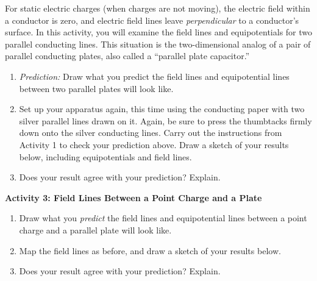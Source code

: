 For static electric charges (when charges are not moving), the 
electric field within a conductor is zero, and electric field lines leave \textit{perpendicular} to a conductor's surface.  
In this activity, you will examine the field lines and equipotentials for two parallel conducting lines.  This situation is the two-dimensional analog of a pair of parallel conducting plates, also called a ``parallel plate capacitor.''

\begin{enumerate}[labparts]
\item \textit{Prediction:} Draw what you predict the field lines and equipotential
lines between two parallel plates will look like.
\answerspace{1.8in}

\item Set up your apparatus again, this time using the conducting paper with two silver parallel lines drawn on it.  Again, be sure to press the thumbtacks firmly down onto the silver conducting lines.  Carry out the instructions from Activity 1 to check your prediction above.  Draw a sketch of your results below, including equipotentials and field lines.
\answerspace{1.8in}

\item Does your result agree with your prediction? Explain.
\answerspace{.5in}

\end{enumerate}
\textbf{Activity 3: Field Lines Between a Point Charge and a Plate}

\begin{enumerate}[labparts]

\item Draw what you \textit{predict} the field lines and equipotential
lines between a point charge and a parallel plate will look like.
\answerspace{1.8in}

\item Map the field lines as before, and draw a sketch of your results below.
\answerspace{1.8in}

\item Does your result agree with your prediction? Explain.
\answerspace{.8in}


\end{enumerate}



